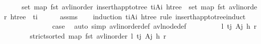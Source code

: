\begin{isabellebody}
\ \ \ \ \ {\isachardoublequoteopen}set\ {\isacharparenleft}{\kern0pt}map\ fst\ {\isacharparenleft}{\kern0pt}avl{\isacharunderscore}{\kern0pt}inorder\ {\isacharparenleft}{\kern0pt}insert{\isacharunderscore}{\kern0pt}happ{\isacharunderscore}{\kern0pt}to{\isacharunderscore}{\kern0pt}tree\ {\isacharparenleft}{\kern0pt}t\isactrlsub i{\isacharcomma}{\kern0pt}A\isactrlsub i{\isacharparenright}{\kern0pt}\ htree{\isacharparenright}{\kern0pt}{\isacharparenright}{\kern0pt}{\isacharparenright}{\kern0pt}\ {\isacharequal}{\kern0pt}\ set\ {\isacharparenleft}{\kern0pt}map\ fst\ {\isacharparenleft}{\kern0pt}avl{\isacharunderscore}{\kern0pt}inorder\ htree{\isacharparenright}{\kern0pt}{\isacharparenright}{\kern0pt}\ {\isasymunion}\ {\isacharbraceleft}{\kern0pt}t\isactrlsub i{\isacharbraceright}{\kern0pt}{\isachardoublequoteclose}\isanewline
%
\isadelimproof
\ \ \ \ %
\endisadelimproof
%
\isatagproof
{}\isamarkupfalse%
\ assms\isanewline
\ \ \isamarkupfalse%
\ {\isacharparenleft}{\kern0pt}induction\ {\isachardoublequoteopen}{\isacharparenleft}{\kern0pt}t\isactrlsub i{\isacharcomma}{\kern0pt}A\isactrlsub i{\isacharparenright}{\kern0pt}{\isachardoublequoteclose}\ htree\ rule{\isacharcolon}{\kern0pt}\ insert{\isacharunderscore}{\kern0pt}happ{\isacharunderscore}{\kern0pt}to{\isacharunderscore}{\kern0pt}tree{\isachardot}{\kern0pt}induct{\isacharparenright}{\kern0pt}\isanewline
\ \ \ \ \isamarkupfalse%
\ {}\isanewline
\ \ \ \ \isamarkupfalse%
\ \isamarkupfalse%
\ {\isacharquery}{\kern0pt}case\ \isamarkupfalse%
\ {\isacharparenleft}{\kern0pt}auto\ simp{\isacharcolon}{\kern0pt}\ avl{\isacharunderscore}{\kern0pt}inorder{\isacharunderscore}{\kern0pt}def\ avl{\isacharunderscore}{\kern0pt}node{\isacharunderscore}{\kern0pt}def{\isacharparenright}{\kern0pt}\isanewline
\ \ \isamarkupfalse%
\isanewline
\ \ \ \ \isamarkupfalse%
\ {\isacharparenleft}{\kern0pt}{}\ l\ t\isactrlsub j\ A\isactrlsub j\ h\ r{\isacharparenright}{\kern0pt}\isanewline
\ \ \ \ \isamarkupfalse%
\ \isamarkupfalse%
\ {\isachardoublequoteopen}strict{\isacharunderscore}{\kern0pt}sorted\ {\isacharparenleft}{\kern0pt}map\ fst\ {\isacharparenleft}{\kern0pt}avl{\isacharunderscore}{\kern0pt}inorder\ {\isasymlangle}l{\isacharcomma}{\kern0pt}\ {\isacharparenleft}{\kern0pt}{\isacharparenleft}{\kern0pt}t\isactrlsub j{\isacharcomma}{\kern0pt}\ A\isactrlsub j{\isacharparenright}{\kern0pt}{\isacharcomma}{\kern0pt}\ h{\isacharparenright}{\kern0pt}{\isacharcomma}{\kern0pt}\ r{\isasymrangle}{\isacharparenright}{\kern0pt}{\isacharparenright}{\kern0pt}{\isachardoublequoteclose}\isanewline

\end{isabellebody}
